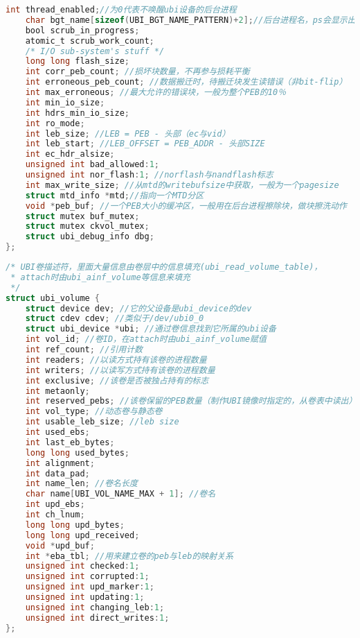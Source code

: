 \begin{lstlisting}[language=C]
	int thread_enabled;//为0代表不唤醒ubi设备的后台进程
	char bgt_name[sizeof(UBI_BGT_NAME_PATTERN)+2];//后台进程名，ps会显示出来
	bool scrub_in_progress;
	atomic_t scrub_work_count;
	/* I/O sub-system's stuff */
	long long flash_size;
	int corr_peb_count; //损坏块数量，不再参与损耗平衡
	int erroneous_peb_count; //数据搬迁时，待搬迁块发生读错误（非bit-flip）
	int max_erroneous; //最大允许的错误块，一般为整个PEB的10％
	int min_io_size;
	int hdrs_min_io_size;
	int ro_mode;
	int leb_size; //LEB = PEB - 头部（ec与vid）
	int leb_start; //LEB_OFFSET = PEB_ADDR - 头部SIZE
	int ec_hdr_alsize;
	unsigned int bad_allowed:1;
	unsigned int nor_flash:1; //norflash与nandflash标志
	int max_write_size; //从mtd的writebufsize中获取，一般为一个pagesize
	struct mtd_info *mtd;//指向一个MTD分区
	void *peb_buf; //一个PEB大小的缓冲区，一般用在后台进程擦除块，做块擦洗动作
	struct mutex buf_mutex;
	struct mutex ckvol_mutex;
	struct ubi_debug_info dbg;
};
\end{lstlisting}

\begin{lstlisting}[language=C]
/* UBI卷描述符，里面大量信息由卷层中的信息填充(ubi_read_volume_table)，
 * attach时由ubi_ainf_volume等信息来填充
 */
struct ubi_volume {
	struct device dev; //它的父设备是ubi_device的dev
	struct cdev cdev; //类似于/dev/ubi0_0
	struct ubi_device *ubi; //通过卷信息找到它所属的ubi设备
	int vol_id; //卷ID，在attach时由ubi_ainf_volume赋值
	int ref_count; //引用计数
	int readers; //以读方式持有该卷的进程数量
	int writers; //以读写方式持有该卷的进程数量
	int exclusive; //该卷是否被独占持有的标志
	int metaonly;
	int reserved_pebs; //该卷保留的PEB数量（制作UBI镜像时指定的，从卷表中读出）
	int vol_type; //动态卷与静态卷
	int usable_leb_size; //leb size
	int used_ebs;
	int last_eb_bytes;
	long long used_bytes;
	int alignment;
	int data_pad;
	int name_len; //卷名长度
	char name[UBI_VOL_NAME_MAX + 1]; //卷名
	int upd_ebs;
	int ch_lnum;
	long long upd_bytes;
	long long upd_received;
	void *upd_buf;
	int *eba_tbl; //用来建立卷的peb与leb的映射关系
	unsigned int checked:1;
	unsigned int corrupted:1;
	unsigned int upd_marker:1;
	unsigned int updating:1;
	unsigned int changing_leb:1;
	unsigned int direct_writes:1;
};
\end{lstlisting}

